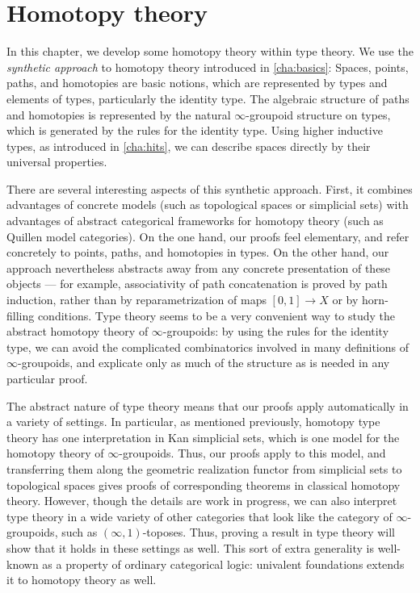 \chapter{Homotopy theory}
\label{cha:homotopy}


In this chapter, we develop some homotopy theory within type theory.  We
use the \emph{synthetic approach} to homotopy theory introduced in
\cref{cha:basics}: Spaces, points, paths, and homotopies are basic
notions, which are represented by types and elements of types, particularly
the identity type.  The algebraic structure of paths and homotopies is
represented by the natural $\infty$-groupoid
%
structure on types, which is generated
by the rules for the identity type.  Using higher inductive types, as
introduced in \cref{cha:hits}, we can describe spaces directly by their
universal properties.  

%
There are several interesting aspects of this synthetic approach.
First, it combines advantages of concrete models (such as topological
spaces
or simplicial sets)
with advantages of abstract categorical frameworks
for homotopy theory (such as Quillen model categories). 
 On the one hand,
our proofs feel elementary, and refer concretely to
points, paths, and homotopies in types.  On the other hand, our approach nevertheless abstracts away from
any concrete presentation of these objects --- for example,
associativity of path concatenation is proved by path induction, rather
than by reparametrization of maps $[0,1] \to X$ or by horn-filling conditions.
Type theory seems to be a very convenient way to study the abstract homotopy theory
of $\infty$-groupoids: by using the rules for the identity type, we
can avoid the complicated combinatorics involved in many definitions of
$\infty$-groupoids, and explicate only as much of the
structure as is needed in any particular proof.  

The abstract nature of type theory means that our proofs apply automatically in a variety of settings.
In particular, as mentioned previously, homotopy type theory has one interpretation in
Kan simplicial sets,
which is one model for the homotopy theory of $\infty$-groupoids.  Thus,
our proofs apply to this model, and transferring them along the geometric
realization functor from simplicial sets to topological spaces gives
proofs of corresponding theorems in classical homotopy theory.
However, though the details are work in progress, we can also
interpret type theory in a wide variety of other categories
that look like the category of $\infty$-groupoids, such as
$(\infty,1)$-toposes.
Thus, proving a result in type theory will show
that it holds in these settings as well.
This sort of extra generality is well-known as a property of ordinary categorical logic:
univalent foundations extends it to homotopy theory as well.

